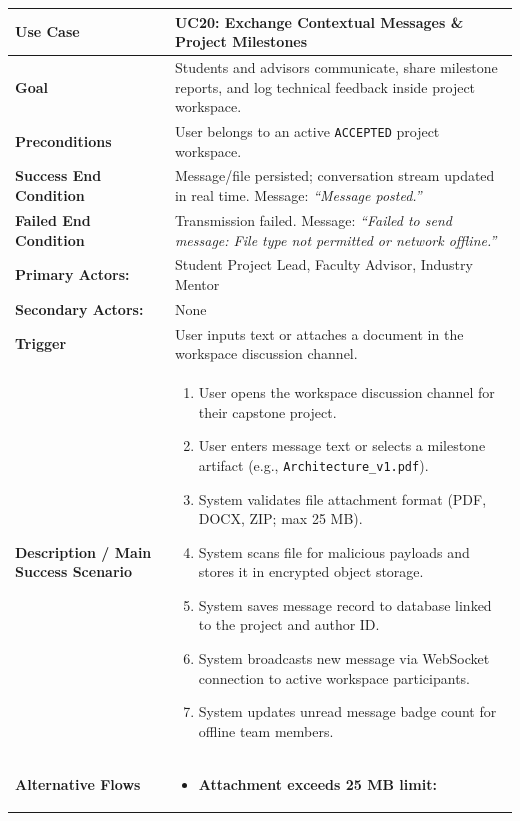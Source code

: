 \begin{table}[H]
\centering
\small
\begin{tabularx}{\textwidth}{|l|X|}
\hline
\rowcolor{lightgray!40} \textbf{Use Case} & \textbf{UC20: Exchange Contextual Messages \& Project Milestones} \\ \hline
\textbf{Goal} & Students and advisors communicate, share milestone reports, and log technical feedback inside project workspace. \\ \hline
\textbf{Preconditions} & User belongs to an active \texttt{ACCEPTED} project workspace. \\ \hline
\textbf{Success End Condition} & Message/file persisted; conversation stream updated in real time. Message: \textit{``Message posted.''} \\ \hline
\textbf{Failed End Condition} & Transmission failed. Message: \textit{``Failed to send message: File type not permitted or network offline.''} \\ \hline
\textbf{Primary Actors:} & Student Project Lead, Faculty Advisor, Industry Mentor \\
\textbf{Secondary Actors:} & None \\ \hline
\textbf{Trigger} & User inputs text or attaches a document in the workspace discussion channel. \\ \hline
\textbf{Description / Main Success Scenario} &
\begin{enumerate}[leftmargin=*]
    \item User opens the workspace discussion channel for their capstone project.
    \item User enters message text or selects a milestone artifact (e.g., \texttt{Architecture\_v1.pdf}).
    \item System validates file attachment format (PDF, DOCX, ZIP; max 25 MB).
    \item System scans file for malicious payloads and stores it in encrypted object storage.
    \item System saves message record to database linked to the project and author ID.
    \item System broadcasts new message via WebSocket connection to active workspace participants.
    \item System updates unread message badge count for offline team members.
\end{enumerate} \\ \hline
\textbf{Alternative Flows} &
\begin{itemize}[leftmargin=*]
    \item[\textbf{3.a.}] \textbf{Attachment exceeds 25 MB limit:}

\end{itemize}
\end{tabularx}
\end{table}
